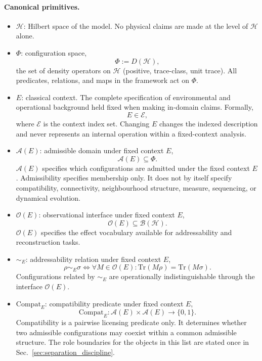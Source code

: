 \documentclass[aps,prx,onecolumn,11pt]{revtex4-2}
\theoremstyle{plain}
\theoremstyle{definition}
\theoremstyle{remark}
\begin{document}
\paragraph{Canonical primitives.}
\begin{itemize}

\item $\mathcal{H}$: Hilbert space of the model.
No physical claims are made at the level of $\mathcal{H}$ alone.

\item $\Phi$: configuration space,
\[
\Phi := D(\mathcal{H}),
\]
the set of density operators on $\mathcal{H}$ (positive,
trace-class, unit trace).
All predicates, relations, and maps in the framework act on $\Phi$.

\item $E$: classical context.
The complete specification of environmental and operational background
held fixed when making in-domain claims.
Formally,
\[
E \in \mathcal{E},
\]
where $\mathcal{E}$ is the context index set.
Changing $E$ changes the indexed description and never represents an
internal operation within a fixed-context analysis.

\item $\mathcal{A}(E)$: admissible domain under fixed context $E$,
\[
\mathcal{A}(E)\subseteq\Phi.
\]
$\mathcal{A}(E)$ specifies which configurations are admitted under the
fixed context $E$.
Admissibility specifies membership only. It does not by itself specify
compatibility, connectivity, neighbourhood structure, measure,
sequencing, or dynamical evolution.

\item $\mathcal{O}(E)$: observational interface under fixed context $E$,
\[
\mathcal{O}(E)\subseteq\mathcal{B}(\mathcal{H}).
\]
$\mathcal{O}(E)$ specifies the effect vocabulary available for
addressability and reconstruction tasks.

\item $\sim_E$: addressability relation under fixed context $E$,
\[
\rho\sim_E\sigma
\Longleftrightarrow
\forall M\in\mathcal{O}(E):
\mathrm{Tr}(M\rho)=\mathrm{Tr}(M\sigma).
\]
Configurations related by $\sim_E$ are operationally
indistinguishable through the interface $\mathcal{O}(E)$.

\item $\mathrm{Compat}_E$: compatibility predicate under fixed context
$E$,
\[
\mathrm{Compat}_E:
\mathcal{A}(E)\times\mathcal{A}(E)
\rightarrow
\{0,1\}.
\]
Compatibility is a pairwise licensing predicate only.
It determines whether two admissible configurations may coexist within
a common admissible structure.
The role boundaries for the objects in this list are stated once in
Sec.~\ref{sec:separation_discipline}.


\end{itemize}
\end{document}
